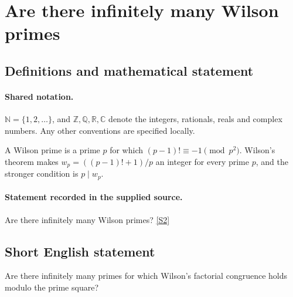 \documentclass[11pt]{article}
\newcommand{\sref}[2]{\hyperlink{source:#1:#2}{[S#2]}}
\begin{document}
\section{Are there infinitely many Wilson primes}\label{statement}

\subsection{Definitions and mathematical statement}

\paragraph{Shared notation.}$\mathbb N=\{1,2,\ldots\}$, and $\mathbb Z,\mathbb Q,\mathbb R,\mathbb C$ denote the integers, rationals, reals and complex numbers. Any other conventions are specified locally.


A Wilson prime is a prime $p$ for which $(p-1)!\equiv-1\pmod{p^2}$. Wilson's theorem makes $w_p=((p-1)!+1)/p$ an integer for every prime $p$, and the stronger condition is $p\mid w_p$.
\paragraph{Statement recorded in the supplied source.}
Are there infinitely many Wilson primes? \sref{statement}{2}
\subsection{Short English statement}
Are there infinitely many primes for which Wilson’s factorial congruence holds modulo the prime square?
\end{document}
